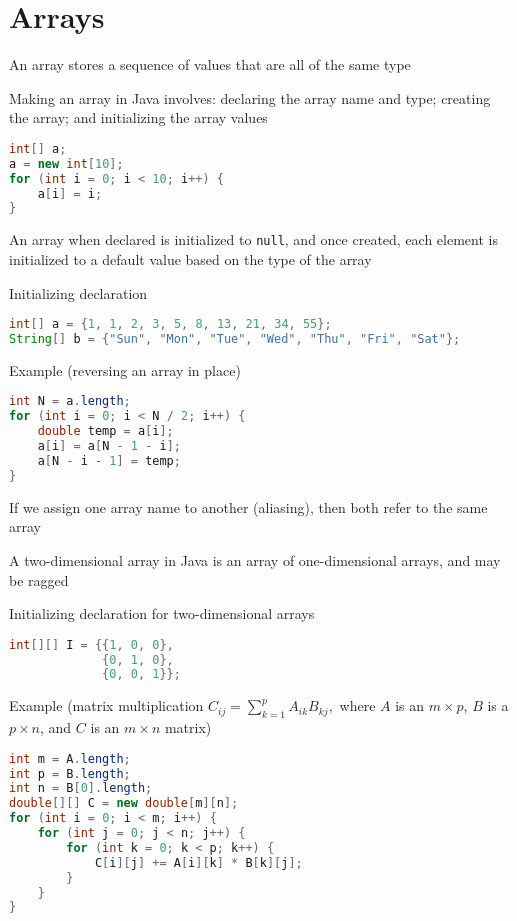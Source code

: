 \documentclass[8pt,a4paper,compress]{beamer}
\begin{document}
\section{Arrays}
\begin{frame}[fragile]
An array stores a sequence of values that are all of the same type 

\bigskip

Making an array in Java involves: declaring the array name and type; creating the array; and initializing the array values
\begin{lstlisting}[language=Java]
int[] a;
a = new int[10];
for (int i = 0; i < 10; i++) {
    a[i] = i;
}
\end{lstlisting}

\bigskip

An array when declared is initialized to \lstinline{null}, and once created, each element is initialized to a default value based on the type of the array

\bigskip

Initializing declaration
\begin{lstlisting}[language=Java]
int[] a = {1, 1, 2, 3, 5, 8, 13, 21, 34, 55};
String[] b = {"Sun", "Mon", "Tue", "Wed", "Thu", "Fri", "Sat"};
\end{lstlisting}

\bigskip

Example (reversing an array in place)
\begin{lstlisting}[language=Java]
int N = a.length;
for (int i = 0; i < N / 2; i++) {
    double temp = a[i];
    a[i] = a[N - 1 - i];
    a[N - i - 1] = temp;
}
\end{lstlisting}
\end{frame}

\begin{frame}[fragile]
If we assign one array name to another (aliasing), then both refer to the same array

\bigskip

A two-dimensional array in Java is an array of one-dimensional arrays, and may be ragged

\bigskip

Initializing declaration for two-dimensional arrays
\begin{lstlisting}[language=Java]
int[][] I = {{1, 0, 0}, 
             {0, 1, 0}, 
             {0, 0, 1}};
\end{lstlisting}

\bigskip

Example (matrix multiplication $C_{ij}=\sum_{k=1}^{p} A_{ik}B_{kj},$ where $A$ is an $m\times p$, $B$ is a $p \times n$, and $C$ is an $m\times n$ matrix)
\begin{lstlisting}[language=Java]
int m = A.length;
int p = B.length;
int n = B[0].length;
double[][] C = new double[m][n];
for (int i = 0; i < m; i++) {
    for (int j = 0; j < n; j++) {
        for (int k = 0; k < p; k++) {
            C[i][j] += A[i][k] * B[k][j];
        }
    }
}
\end{lstlisting}
\end{frame}
\end{document}
